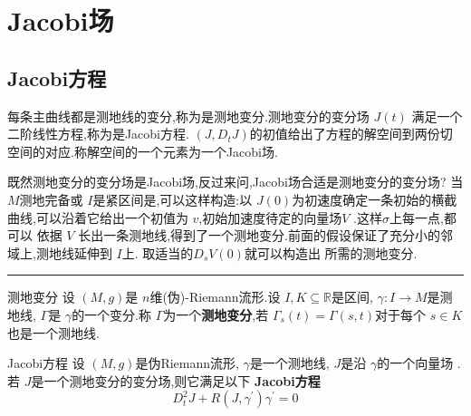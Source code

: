 \documentclass[../../几何与拓扑.tex]{subfiles}
\begin{document}
    
\ifSubfilesClassLoaded{
    \frontmatter

    \tableofcontents
    
    \mainmatter
}{}


\chapter{Jacobi场}

\section{Jacobi方程}

每条主曲线都是测地线的变分,称为是测地变分.测地变分的变分场 \(  J\left( t \right)   \) 满足一个二阶线性方程,称为是Jacobi方程. \(  \left( J,D_{t}J \right)   \)的初值给出了方程的解空间到两份切空间的对应.称解空间的一个元素为一个Jacobi场.

既然测地变分的变分场是Jacobi场,反过来问,Jacobi场合适是测地变分的变分场?
当 \(  M  \)测地完备或 \(  I  \)是紧区间是,可以这样构造:以 \(  J\left( 0 \right)   \)为初速度确定一条初始的横截曲线,可以沿着它给出一个初值为 \(  v  \),初始加速度待定的向量场\(  V  \) .这样\(   \sigma   \)上每一点,都可以 依据 \(  V  \) 长出一条测地线,得到了一个测地变分.前面的假设保证了充分小的邻域上,测地线延伸到 \(  I  \)上.  取适当的\(  D_{s}V \left( 0 \right)  \)就可以构造出 所需的测地变分.


\hspace*{\fill} 
\hrule
\hspace*{\fill}



\begin{definition}{测地变分}
    设 \(  \left( M,g \right)   \)是 \(  n  \)维(伪)-Riemann流形.设 \(  I,K\subseteq \mathbb{R}   \)是区间, \(   \gamma :I\to M  \)是测地线, \(   \Gamma   \)是 \(   \gamma   \)的一个变分.称 \(   \Gamma   \)为一个\textbf{测地变分},若 \(   \Gamma _{s}\left( t \right)=  \Gamma \left( s,t \right)    \)对于每个 \(  s  \in K\)         也是一个测地线.
\end{definition}

\begin{theorem}{Jacobi方程}
    设 \(  \left( M,g \right)   \)是伪Riemann流形, \(   \gamma   \)是一个测地线, \(  J  \)是沿 \(   \gamma   \)的一个向量场  .若 \(  J  \)是一个测地变分的变分场,则它满足以下 \textbf{Jacobi方程} \[
    D_{t}^{2}J+ R\left( J, \gamma ^{\prime}  \right) \gamma ^{\prime} = 0 
    \]   
\end{theorem}
\end{document}
